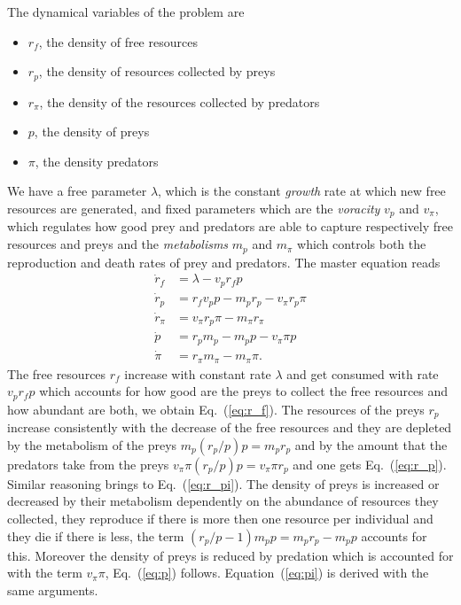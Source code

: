 \documentclass[10pt]{article}
\begin{document}
The dynamical variables of the problem are
\begin{itemize}
\item
{
	\(r_f\), the density of free resources
}
\item
{
	\(r_p\), the density of resources collected by preys
} 
\item
{
	\(r_{\pi}\), the density of the resources collected by predators
}
\item
{
	\(p\), the density of preys
}
\item
{
	\(\pi\), the density predators
}
\end{itemize}
We have a free parameter \(\lambda\), which is the constant {\it growth} rate at which new free resources are generated,
and fixed parameters which are the {\it voracity} \(v_p\) and \(v_{\pi}\), which regulates how good
prey and predators are able to capture respectively free resources and preys and the
{\it metabolisms} \(m_p\) and \(m_{\pi}\) which controls both the reproduction and death rates of
prey and predators.
The master equation reads
\begin{align}
\dot{r}_f&=\lambda -v_pr_fp \label{eq:r_f}\\
\dot{r}_p&= r_fv_pp-m_pr_p-v_{\pi}r_p\pi \label{eq:r_p}\\
\dot{r}_{\pi}&= v_{\pi}r_p\pi-m_{\pi}r_{\pi} \label{eq:r_pi}\\
\dot{p}&= r_pm_p-m_pp-v_{\pi}\pi p \label{eq:p}\\
\dot{\pi}&= r_{\pi}m_{\pi}-m_{\pi}\pi \label{eq:pi}.
\end{align}
The free resources \(r_f\) increase with constant rate \(\lambda\) and get consumed
with rate \(v_pr_fp\) which accounts for how good are the preys to collect the free resources and how
abundant are both, we obtain Eq.~(\ref{eq:r_f}). The resources of the preys \(r_p\)
increase consistently with the decrease of the free resources and they are depleted
by the metabolism of the preys \(m_p(r_p/p)p=m_pr_p\) and by the amount that the predators
take from the preys \(v_{\pi}\pi(r_p/p)p=v_{\pi}\pi r_p\) and one gets Eq.~(\ref{eq:r_p}).
Similar reasoning brings to Eq.~(\ref{eq:r_pi}). The density of preys is increased or decreased
by their metabolism dependently on the abundance of resources they collected, they reproduce if there is more
then one resource per individual and they die if there is less, the term 
\((r_p/p-1)m_pp=m_pr_p-m_pp\) accounts for this. Moreover the density of preys is reduced by predation
which is accounted for with the term \(v_{\pi}\pi\), Eq.~(\ref{eq:p}) follows. Equation~(\ref{eq:pi})
is derived with the same arguments.
\end{document}
